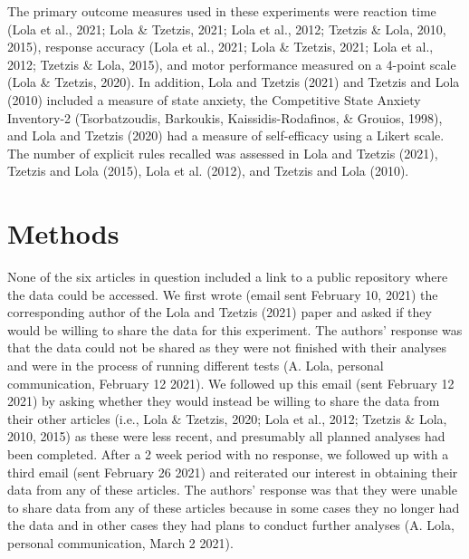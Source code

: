 \documentclass[
  english,
  man, donotrepeattitle,floatsintext]{apa7}
\begin{document}
The primary outcome measures used in these experiments were reaction time (Lola et al., 2021; Lola \& Tzetzis, 2021; Lola et al., 2012; Tzetzis \& Lola, 2010, 2015), response accuracy (Lola et al., 2021; Lola \& Tzetzis, 2021; Lola et al., 2012; Tzetzis \& Lola, 2015), and motor performance measured on a 4-point scale (Lola \& Tzetzis, 2020). In addition, Lola and Tzetzis (2021) and Tzetzis and Lola (2010) included a measure of state anxiety, the Competitive State Anxiety Inventory-2 (Tsorbatzoudis, Barkoukis, Kaissidis-Rodafinos, \& Grouios, 1998), and Lola and Tzetzis (2020) had a measure of self-efficacy using a Likert scale. The number of explicit rules recalled was assessed in Lola and Tzetzis (2021), Tzetzis and Lola (2015), Lola et al. (2012), and Tzetzis and Lola (2010).

\hypertarget{methods}{%
\section{Methods}\label{methods}}

None of the six articles in question included a link to a public repository where the data could be accessed. We first wrote (email sent February 10, 2021) the corresponding author of the Lola and Tzetzis (2021) paper and asked if they would be willing to share the data for this experiment. The authors' response was that the data could not be shared as they were not finished with their analyses and were in the process of running different tests (A. Lola, personal communication, February 12 2021). We followed up this email (sent February 12 2021) by asking whether they would instead be willing to share the data from their other articles (i.e., Lola \& Tzetzis, 2020; Lola et al., 2012; Tzetzis \& Lola, 2010, 2015) as these were less recent, and presumably all planned analyses had been completed. After a 2 week period with no response, we followed up with a third email (sent February 26 2021) and reiterated our interest in obtaining their data from any of these articles. The authors' response was that they were unable to share data from any of these articles because in some cases they no longer had the data and in other cases they had plans to conduct further analyses (A. Lola, personal communication, March 2 2021).
\end{document}

